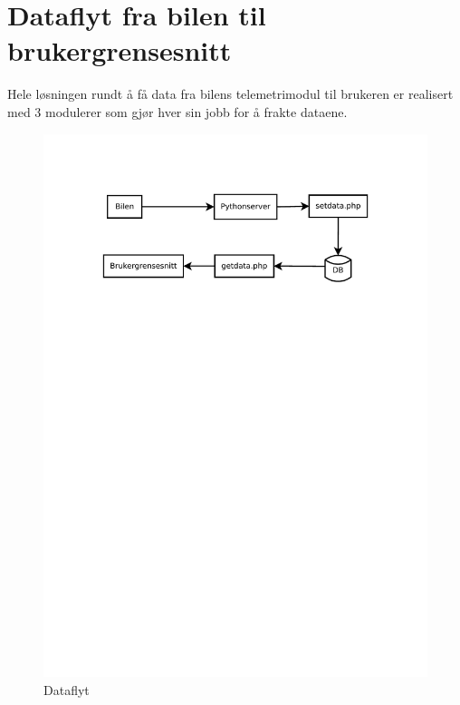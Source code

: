\section{Dataflyt fra bilen til brukergrensesnitt}
Hele løsningen rundt å få data fra bilens telemetrimodul til brukeren er realisert med 3 modulerer som gjør hver sin jobb for å frakte dataene.
\begin{figure}[H]
\caption{Dataflyt} 
\label{dataflow}
\includegraphics[width=\textwidth, trim=0 550 0 75]{images/dataflow.pdf}
\end{figure}
